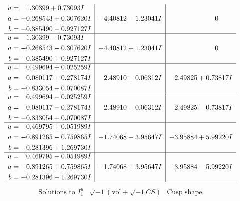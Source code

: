 \documentclass[1p]{elsarticle_modified}
\theoremstyle{definition}
\newcommand{\I}{\sqrt{-1}}
\begin{document}
$$\begin{array}{c|c|c}
\begin{aligned}
u &= \phantom{-}1.30399 + 0.73093 I \\
a &= -0.268543 + 0.307620 I \\
b &= -0.385490 - 0.927127 I\end{aligned}
 & -4.40812 - 1.23041 I & \phantom{-0.000000 } 0 \\ \hline\begin{aligned}
u &= \phantom{-}1.30399 - 0.73093 I \\
a &= -0.268543 - 0.307620 I \\
b &= -0.385490 + 0.927127 I\end{aligned}
 & -4.40812 + 1.23041 I & \phantom{-0.000000 } 0 \\ \hline\begin{aligned}
u &= \phantom{-}0.499694 + 0.025259 I \\
a &= \phantom{-}0.080117 + 0.278174 I \\
b &= -0.833054 - 0.070087 I\end{aligned}
 & \phantom{-}2.48910 + 0.06312 I & \phantom{-}2.49825 + 0.73817 I \\ \hline\begin{aligned}
u &= \phantom{-}0.499694 - 0.025259 I \\
a &= \phantom{-}0.080117 - 0.278174 I \\
b &= -0.833054 + 0.070087 I\end{aligned}
 & \phantom{-}2.48910 - 0.06312 I & \phantom{-}2.49825 - 0.73817 I \\ \hline\begin{aligned}
u &= \phantom{-}0.469795 + 0.051989 I \\
a &= -0.891265 - 0.759865 I \\
b &= -0.281396 + 1.269730 I\end{aligned}
 & -1.74068 - 3.95647 I & -3.95884 + 5.99220 I \\ \hline\begin{aligned}
u &= \phantom{-}0.469795 - 0.051989 I \\
a &= -0.891265 + 0.759865 I \\
b &= -0.281396 - 1.269730 I\end{aligned}
 & -1.74068 + 3.95647 I & -3.95884 - 5.99220 I\\
 \hline 
 \end{array}$$\newpage$$\begin{array}{c|c|c}  
\text{Solutions to }I^u_{1}& \I (\text{vol} + \sqrt{-1}CS) & \text{Cusp shape}\\
 \hline 
\begin{aligned}

\end{aligned}
\end{array}$$
\end{document}

